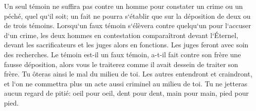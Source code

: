 \verse Un seul témoin ne suffira pas contre un homme pour constater un crime ou un péché, quel qu`il soit; un fait ne pourra s`établir que sur la déposition de deux ou de trois témoins. 
\verse Lorsqu`un faux témoin s`élèvera contre quelqu`un pour l`accuser d`un crime, 
\verse les deux hommes en contestation comparaîtront devant l`Éternel, devant les sacrificateurs et les juges alors en fonctions. 
\verse Les juges feront avec soin des recherches. Le témoin est-il un faux témoin, a-t-il fait contre son frère une fausse déposition, 
\verse alors vous le traiterez comme il avait dessein de traiter son frère. Tu ôteras ainsi le mal du milieu de toi. 
\verse Les autres entendront et craindront, et l`on ne commettra plus un acte aussi criminel au milieu de toi. 
\verse Tu ne jetteras aucun regard de pitié: oeil pour oeil, dent pour dent, main pour main, pied pour pied. 

\chapter{}

